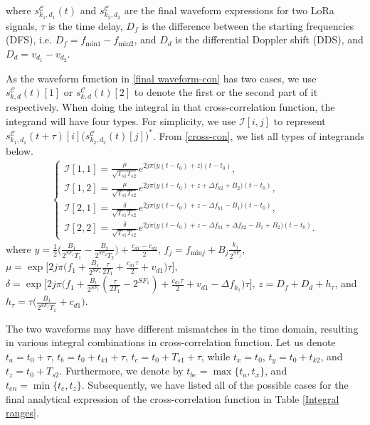 \documentclass{IEEEtaes}
\theoremstyle{plain}
\begin{document}
where $s^\mathcal{C}_{k_1,d_1}(t)$ and $s^\mathcal{C}_{k_2,d_2}$ are the final waveform expressions for two LoRa signals, $\tau$ is the time delay, $D_f$ is the difference between the starting frequencies (DFS), i.e. $D_f = f_{\text{min}1}-f_{\text{min}2}$, and $D_d$ is the differential Doppler shift (DDS), and $D_d =v_{d_1} - v_{d_2}$.

As the waveform function in \eqref{final waveform-con} has two cases, we use $s^\mathcal{C} _{k,d}(t)[1]$ or $s^\mathcal{C} _{k,d}(t)[2]$ to denote the first or the second part of it respectively.
When doing the integral in that cross-correlation function, the integrand will have four types. 
For simplicity, we use $\mathcal{I}[i,j]$ to represent $s^\mathcal{C}_{k_1,d_1}(t+\tau)[i]\Big(s^\mathcal{C}_{k_2,d_2}(t)[j]\Big)^*$. From \eqref{cross-con}, we list all types of integrands below.
\begin{equation}
  \label{four types-con}
  \begin{aligned}
    \begin{cases}
      \mathcal{I}[1,1]
           \!=\! \frac{\mu}{\sqrt{T_{s1}T_{s2}}}e^{2j\pi\Big(y(t-t_0)+z\Big)(t-t_0)},\\
      \mathcal{I}[1,2]
           \!=\! \frac{\mu}{\sqrt{T_{s1}T_{s2}}}e^{2j\pi\Big(y(t-t_0)+z+\Delta f_{k2}+B_2\Big)(t-t_0)},\\
      \mathcal{I}[2,1]
           \!=\! \frac{\delta}{\sqrt{T_{s1}T_{s2}}}e^{2j\pi\Big(y(t-t_0)+z-\Delta f_{k1}-B_1\Big)(t-t_0)},\\
      \mathcal{I}[2,2]
           \!=\! \frac{\delta}{\sqrt{T_{s1}T_{s2}}}e^{2j\pi\Big(y(t-t_0)+z-\Delta f_{k1}+\Delta f_{k2}\!-\!B_1\!+\!B_2\Big)(t-t_0)}.
      \end{cases}      
  \end{aligned}
\end{equation}
where $y = \frac{1}{2}\Big(\frac{B_1}{2^{SF_1}T_1}-\frac{B_2}{2^{SF_2}T_2}\Big)  + \frac{c_{d1}-c_{d2}}{2}$, $f_j = f_{\text{min}j} + B_j  \frac{k_j}{2^{SF_j}} $, $\mu = \exp\Big[2j\pi \big(f_1+\frac{B_1}{ 2^{SF_1}}\frac{\tau}{2T_1}+\frac{c_{d1}\tau}{2}+v_{d1}\big)\tau\Big]$, $\delta = \exp\Big[2j\pi \big(f_1+\frac{B_1}{ 2^{SF_1}}(\frac{\tau}{2T_1}-2^{SF_1})+\frac{c_{d1}\tau}{2}+v_{d1}-\Delta f_{k_1}\big)\tau\Big]$, $z = D_f +D_d+h_{\tau}$, and $h_{\tau} = \tau\Big(\frac{B_1}{2^{SF_1}T_1}+c_{d1}\Big)$.


The two waveforms may have different mismatches in the time domain, resulting in various integral combinations in cross-correlation function. Let us denote $t_{\textit{a}} = t_0+\tau$, $t_{\textit{b}} = t_0+t_{k1}+\tau$, $t_{\textit{c}} = t_0+T_{s1}+\tau$, while $t_{\textit{x}} = t_0$, $t_{\textit{y}} = t_0+t_{k2}$, and $t_{\textit{z}} = t_0+T_{s2}$. Furthermore, we denote by $t_{\textit{be}}=\max\{t_{\textit{a}},t_{\textit{x}}\}$, and $t_{\textit{en}}=\min\{t_{\textit{c}},t_{\textit{z}}\}$. Subsequently, we have listed all of the possible cases for the final analytical expression of the cross-correlation function in Table \ref{Integral ranges}. 
\end{document}
